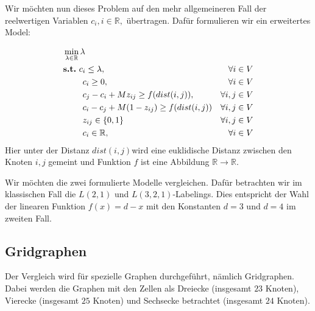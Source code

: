 \documentclass[
	fontsize=12pt,
	paper=a4,
	twoside=false,
	numbers=noenddot,
	plainheadsepline,
	toc=listof,
	toc=bibliography
]{scrartcl}
\begin{document}
Wir möchten nun dieses Problem auf den mehr allgemeineren Fall der reelwertigen Variablen $c_i, i\in\mathbb{R},$ übertragen.
Dafür formulieren wir ein erweitertes Model:

\begin{align}\label{model2}
& \min_{\lambda\in\mathbb{R}}\lambda & \\
\label{m21} & \text{\bf s.t.}\ c_{i}\le\lambda,& \forall i\in V \\
\label{m22} & \hspace{23 pt} c_{i}\ge 0, & \forall i\in V \\
\label{m23} & \hspace{23 pt} c_j-c_i + M z_{ij}\ge f({dist(i,j)}), & \forall i,j\in V\\
\label{m24} & \hspace{23 pt} c_i-c_j + M(1-z_{ij})\ge f({dist(i,j)})& \forall i,j\in V\\
\label{m25} & \hspace{23 pt} z_{ij}\in \{0,1\}& \forall i,j\in V \\
\label{m26} & \hspace{23 pt} c_{i}\in \mathbb{R},& \forall i\in V
\end{align}
Hier unter der Distanz $dist(i,j)$wird  eine euklidische Distanz zwischen den Knoten $i,j$ gemeint und Funktion $f$ ist eine Abbildung $\mathbb{R}\rightarrow\mathbb{R}$.

Wir möchten die zwei formulierte Modelle vergleichen. Dafür betrachten wir im klassischen Fall die $L(2,1)$ und $L(3,2,1)$-Labelings. Dies entspricht der Wahl der linearen Funktion $f(x)= d-x$ mit den Konstanten $d=3$ und $d=4$ im zweiten Fall.

\subsection*{Gridgraphen}
Der Vergleich wird für spezielle Graphen durchgeführt, nämlich Gridgraphen. Dabei werden die Graphen mit den Zellen als Dreiecke (insgesamt $23$ Knoten), Vierecke (insgesamt $25$ Knoten) und Sechsecke betrachtet (insgesamt $24$ Knoten). 
\end{document}
